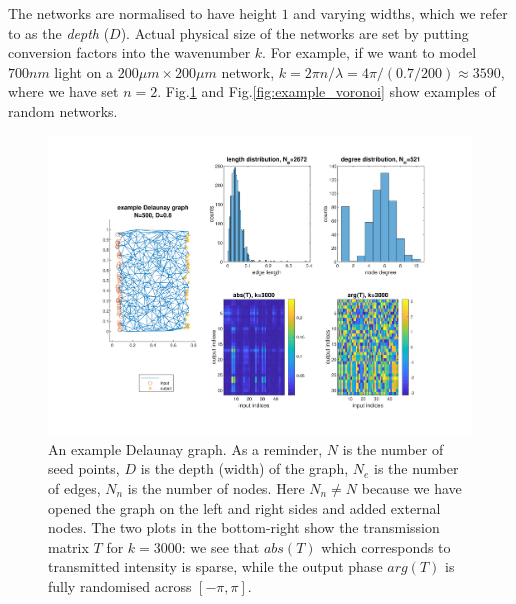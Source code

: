 The networks are normalised to have height $1$ and varying widths, which we refer to as the \textit{depth} ($D$). Actual physical size of the networks are set by putting conversion factors into the wavenumber $k$. For example, if we want to model $700nm$ light on a $200\mu m \times 200 \mu m$ network, $k=2\pi n/\lambda = 4\pi/(0.7/200) \approx 3590$, where we have set $n=2$. Fig.\ref{fig:example_delaunay} and Fig.\ref{fig:example_voronoi} show examples of random networks.
\begin{figure}[h]
  \centering
    \includegraphics[width=\textwidth]{ch3/fig3/example_d.pdf}
    \caption{An example Delaunay graph. As a reminder, $N$ is the number of seed points, $D$ is the depth (width) of the graph, $N_e$ is the number of edges, $N_n$ is the number of nodes. Here $N_n \neq N$ because we have opened the graph on the left and right sides and added external nodes. The two plots in the bottom-right show the transmission matrix $T$ for $k=3000$: we see that $abs(T)$ which corresponds to transmitted intensity is sparse, while the output phase $arg(T)$ is fully randomised across $[-\pi,\pi]$.} 
    \label{fig:example_delaunay}
\end{figure}

